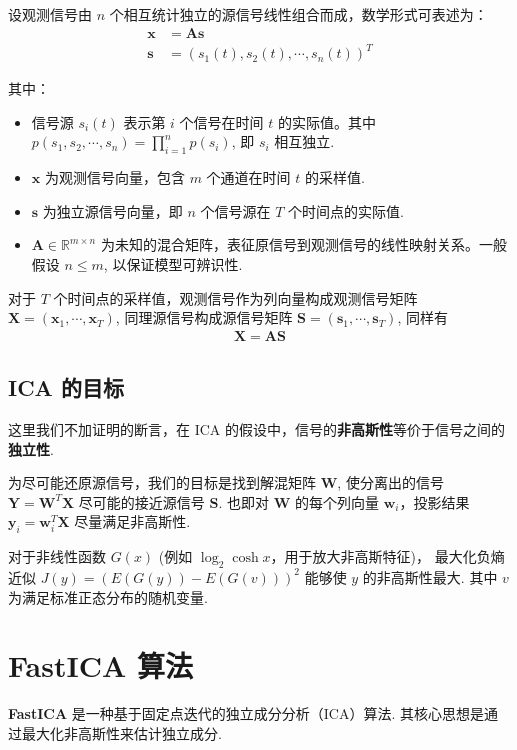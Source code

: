 \documentclass{article}
\newcommand{\bs}[1]{\boldsymbol{#1}}
\newcommand{\RR}{\mathbb{R}}
\newcommand{\np}{\indent\par}
\begin{document}
设观测信号由 $n$ 个相互统计独立的源信号线性组合而成，数学形式可表述为：
\begin{align*}
    \bs{x} &= \bs{A}\bs{s} \\
    \bs{s} &= \left(s_1(t), s_2(t), \cdots, s_n(t)\right)^T
\end{align*}

其中：
\begin{itemize}
    \item 信号源 $s_i(t)$ 表示第 $i$ 个信号在时间 $t$ 的实际值。其中 $p(s_1, s_2, \cdots, s_n) = \prod_{i = 1}^{n}p(s_i)$, 即 $s_i$ 相互独立.
    \item $\bs{x}$ 为观测信号向量，包含 $m$ 个通道在时间 $t$ 的采样值.
    \item $\bs{s}$ 为独立源信号向量，即 $n$ 个信号源在 $T$ 个时间点的实际值. 
    \item $\bs{A} \in \RR^{m \times n}$ 为未知的混合矩阵，表征原信号到观测信号的线性映射关系。一般假设 $n \leq m$, 以保证模型可辨识性.
\end{itemize}

对于 $T$ 个时间点的采样值，观测信号作为列向量构成观测信号矩阵 $\bs{X} = (\bs{x}_1, \cdots, \bs{x}_T)$, 同理源信号构成源信号矩阵 $\bs{S} = (\bs{s}_1, \cdots, \bs{s}_T)$, 同样有
\begin{align*}
    \bs{X} = \bs{AS}
\end{align*}

\subsection{ICA 的目标}

这里我们不加证明的断言，在 ICA 的假设中，信号的\textbf{非高斯性}等价于信号之间的\textbf{独立性}. \np
为尽可能还原源信号，我们的目标是找到解混矩阵 $\bs{W}$, 使分离出的信号 $\bs{Y} = \bs{W}^T\bs{X}$ 尽可能的接近源信号 $\bs{S}$. 也即对 $\bs{W}$ 的每个列向量 $\bs{w}_i$，投影结果 $\bs{y}_i = \bs{w}_i^T\bs{X}$ 尽量满足非高斯性.\np
对于非线性函数 $G(x)$ (例如 $\log_2\cosh x$，用于放大非高斯特征)， 最大化负熵近似 $J(y) = \left(E(G(y)) - E(G(v))\right)^2$ 能够使 $y$ 的非高斯性最大. 其中 $v$ 为满足标准正态分布的随机变量.

\section{FastICA 算法}

\textbf{FastICA} 是一种基于固定点迭代的独立成分分析（ICA）算法. 其核心思想是通过最大化非高斯性来估计独立成分. 
\end{document}
